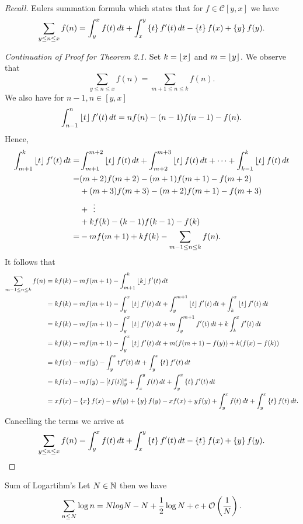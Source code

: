\documentclass[twoside, openright, fontsize=10pt, headings=big]{scrbook}
\begin{document}
\textit{Recall.} Eulers summation formula which states that for $f\in\mathcal{C}[y,x]$ we have
\[
    \sum_{y\leq n\leq x}f(n)=\int_{y}^{x}f(t)\,dt+\int_{x}^{y}\left\{ t \right\}f'(t)\,dt-\left\{ t \right\}f(x)+\left\{ y \right\}f(y).
\]
\begin{proof}[Continuation of Proof for Theorem 2.1]
    Set $k=\left\lfloor x \right\rfloor$ and $m=\left\lfloor y \right\rfloor$. We observe that
    \[
        \sum_{y\leq n\leq x}f(n)=\sum_{m+1\leq n\leq k}f(n).
    \]
    We also have for $n-1,n\in[y,x]$
    \[
        \int_{n-1}^{n}\left\lfloor t \right\rfloor f'(t)\,dt=nf(n)-(n-1)f(n-1)-f(n).
    \]
    Hence,
    \begin{align*}
        \int_{m+1}^{k}\left\lfloor t \right\rfloor f'(t)\,dt=&\int_{m+1}^{m+2}\left\lfloor t \right\rfloor f(t)\,dt+\int_{m+2}^{m+3}\left\lfloor t \right\rfloor f(t)\,dt+\cdots+\int_{k-1}^{k}\left\lfloor t \right\rfloor f(t)\,dt\\
        =&(m+2)f(m+2)-(m+1)f(m+1)-f(m+2)\\
        &+(m+3)f(m+3)-(m+2)f(m+1)-f(m+3)\\
        &+\;\,\vdots\\
        &+kf(k)-(k-1)f(k-1)-f(k)\\
        =&-mf(m+1)+kf(k)-\sum_{m-1\leq n\leq k}f(n).
    \end{align*}
    It follows that
    \begin{align*}
        \sum_{m-1\leq n\leq k}f(n)&=kf(k)-mf(m+1)-\int_{m+1}^{k}\left\lfloor k \right\rfloor f'(t)\,dt\\
        &=kf(k)-mf(m+1)-\int_{y}^{x}\left\lfloor t \right\rfloor f'(t)\,dt+\int_{y}^{m+1}\left\lfloor t \right\rfloor f'(t)\,dt+\int_{k}^{x}\left\lfloor t \right\rfloor f'(t)\,dt\\
        &=kf(k)-mf(m+1)-\int_{y}^{x}\left\lfloor t \right\rfloor f'(t)\,dt+m\int_{y}^{m+1}f'(t)\,dt+k\int_{k}^{x}f'(t)\,dt\\
        &=kf(k)-mf(m+1)-\int_{y}^{x}\left\lfloor t \right\rfloor f'(t)\,dt+m(f(m+1)-f(y))+k(f(x)-f(k))\\
        &=kf(x)-mf(y)-\int_{y}^{x}tf'(t)\,dt+\int_{y}^{x}\left\{ t \right\}f'(t)\,dt\\
        &=kf(x)-mf(y)-[tf(t)]_y^x+\int_{x}^{y}f(t)\,dt+\int_{y}^{x}\left\{ t \right\}f'(t)\,dt\\
        &=xf(x)-\left\{ x \right\}f(x)-yf(y)+\left\{ y \right\}f(y)-xf(x)+yf(y)+\int_{y}^{x}f(t)\,dt+\int_{y}^{x}\left\{ t \right\}f(t)\,dt.
    \end{align*}
    Cancelling the terms we arrive at 
    \[
                \sum_{y\leq n\leq x}f(n)=\int_{y}^{x}f(t)\,dt+\int_{x}^{y}\left\{ t \right\}f'(t)\,dt-\left\{ t \right\}f(x)+\left\{ y \right\}f(y).\qedhere
    \]
\end{proof}
\begin{theorem}{Sum of Logartihm's}{}
    Let $N\in\mathbb{N}$ then we have
    \[
    \sum_{n\leq N}\log n=Nlog N-N+\frac{1}{2}\log N + c+\mathcal{O}\left(\frac{1}{N}\right).
    \]
\end{theorem}
\end{document}
